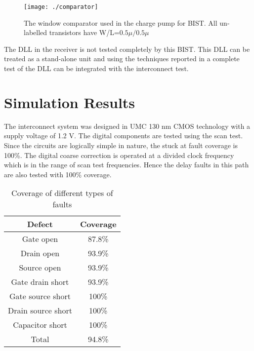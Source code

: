 \documentclass[conference]{IEEEtran}
\begin{document}
\begin{figure}[h!]
\centering
{}
\texttt{[image: ./comparator]}
\caption{The window comparator used in the charge pump for BIST.
All un-labelled transistors have W/L=$0.5\mu /0.5\mu$}
\label{fig:window-comp-dc}
\end{figure}
The DLL in the receiver is not tested completely by this BIST. This DLL can
be treated as a stand-alone unit and using the techniques 
reported in \cite{bist-dll1,bist-dll2} a complete test of the DLL
can be integrated with the interconnect test.



\section{Simulation Results}
The interconnect system was designed in UMC 130 nm CMOS technology with a 
supply voltage of 1.2 V. The digital components are tested using the scan test.
Since the circuits are logically simple in nature, the stuck at fault
coverage is 100\%. The digital coarse correction is operated at a divided clock 
frequency which is in the range of scan test frequencies. Hence the delay
faults in this path are also tested with 100\% coverage. 



\begin{table}[h]
\begin{center}
\caption{Coverage of different types of faults}
\label{tbl:coverage}
\begin{tabular}{|c|c|}
\hline
Defect & Coverage \\ \hline
Gate open & 87.8\% \\ 
Drain open & 93.9\% \\ 
Source open & 93.9\% \\
Gate drain short & 93.9\% \\ 
Gate source short & 100\% \\ 
Drain source short & 100\% \\
Capacitor short & 100\% \\ \hline
Total & 94.8\% \\ \hline
\end{tabular}
\end{center}
\end{table}
\end{document}
